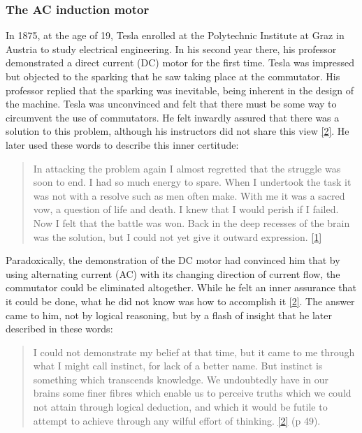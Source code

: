 \documentclass[
  a4paper,
]{article}
\begin{document}
\hypertarget{the-ac-induction-motor}{%
\subsubsection{The AC induction motor}\label{the-ac-induction-motor}}

In 1875, at the age of 19, Tesla enrolled at the Polytechnic Institute
at Graz in Austria to study electrical engineering. In his second year
there, his professor demonstrated a direct current (DC) motor for the
first time. Tesla was impressed but objected to the sparking that he saw
taking place at the commutator. His professor replied that the sparking
was inevitable, being inherent in the design of the machine. Tesla was
unconvinced and felt that there must be some way to circumvent the use
of commutators. He felt inwardly assured that there was a solution to
this problem, although his instructors did not share this view
\protect\hyperlink{ref-oneill80}{{[}2{]}}. He later used these words to
describe this inner certitude:

\begin{quote}
In attacking the problem again I almost regretted that the struggle was
soon to end. I had so much energy to spare. When I undertook the task it
was not with a resolve such as men often make. With me it was a sacred
vow, a question of life and death. I knew that I would perish if I
failed. Now I felt that the battle was won. Back in the deep recesses of
the brain was the solution, but I could not yet give it outward
expression. \protect\hyperlink{ref-john83}{{[}1{]}}
\end{quote}

Paradoxically, the demonstration of the DC motor had convinced him that
by using alternating current (AC) with its changing direction of current
flow, the commutator could be eliminated altogether. While he felt an
inner assurance that it could be done, what he did not know was how to
accomplish it \protect\hyperlink{ref-oneill80}{{[}2{]}}. The answer came
to him, not by logical reasoning, but by a flash of insight that he
later described in these words:

\begin{quote}
I could not demonstrate my belief at that time, but it came to me
through what I might call instinct, for lack of a better name. But
instinct is something which transcends knowledge. We undoubtedly have in
our brains some finer fibres which enable us to perceive truths which we
could not attain through logical deduction, and which it would be futile
to attempt to achieve through any wilful effort of thinking.
\protect\hyperlink{ref-oneill80}{{[}2{]}} (p 49).
\end{quote}
\end{document}
